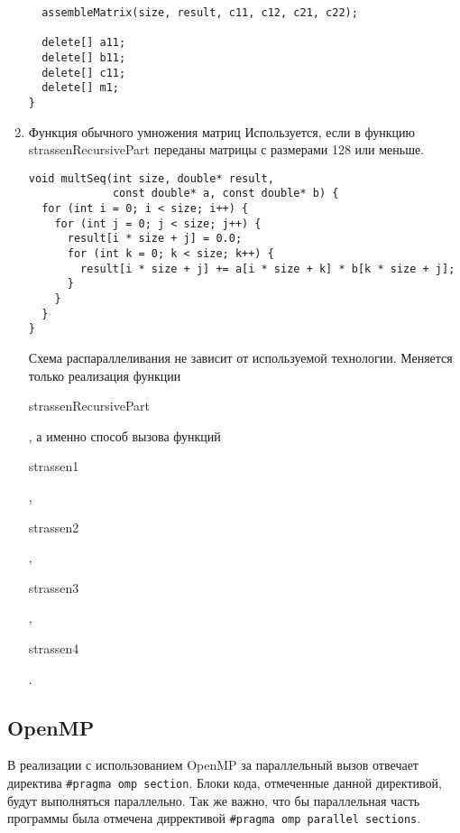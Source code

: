 \documentclass{report}
\begin{document}
\begin{center}
\begin{enumerate}
\begin{lstlisting}
  assembleMatrix(size, result, c11, c12, c21, c22);

  delete[] a11;
  delete[] b11;
  delete[] c11;
  delete[] m1;
}
\end{lstlisting}

\item Функция обычного умножения матриц
Используется, если в функцию strassenRecursivePart переданы матрицы с размерами 128 или меньше.

\begin{lstlisting}
void multSeq(int size, double* result,
             const double* a, const double* b) {
  for (int i = 0; i < size; i++) {
    for (int j = 0; j < size; j++) {
      result[i * size + j] = 0.0;
      for (int k = 0; k < size; k++) {
        result[i * size + j] += a[i * size + k] * b[k * size + j];
      }
    }
  }
}
\end{lstlisting}
\par Схема распараллеливания не зависит от используемой технологии. Меняется только реализация функции \begin{lstinline}strassenRecursivePart\end{lstinline}, а именно способ вызова функций \begin{lstinline}strassen1\end{lstinline}, \begin{lstinline}strassen2\end{lstinline}, \begin{lstinline}strassen3\end{lstinline}, \begin{lstinline}strassen4\end{lstinline}.

\end{enumerate}

\subsection{OpenMP}
\par В реализации с использованием OpenMP за параллельный вызов отвечает директива \lstinline{#pragma omp section}. Блоки кода, отмеченные данной директивой, будут выполняться параллельно. Так же важно, что бы параллельная часть программы была отмечена диррективой \lstinline{#pragma omp parallel sections}.


\end{center}
\end{document}
